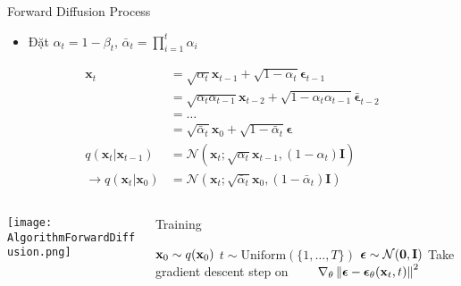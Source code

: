 \begin{frame}{Forward Diffusion Process}
\small
\begin{itemize}[]
	\item Đặt $\alpha_t = 1 - \beta_t$, $\bar{\alpha}_t = \prod_{i=1}^t \alpha_i$
\end{itemize}
\vspace{-15pt}
\begin{align*}
	\mathbf{x}_t & = \sqrt{\alpha_t}\mathbf{x}_{t-1} + \sqrt{1 - \alpha_t} \boldsymbol{\epsilon}_{t-1} \\
						& = \sqrt{\alpha_t \alpha_{t-1}} \mathbf{x}_{t-2} + \sqrt{1 - \alpha_t \alpha_{t-1}} \bar{\boldsymbol{\epsilon}}_{t-2} \\
						& = \dots \\
						& = \sqrt{\bar{\alpha}_t}\mathbf{x}_0 + \sqrt{1 - \bar{\alpha}_t}\boldsymbol{\epsilon} \\
						q(\mathbf{x}_t \vert \mathbf{x}_{t-1}) &= \mathcal{N}(\mathbf{x}_t; \sqrt{\alpha_t} \mathbf{x}_{t-1}, (1 - \alpha_t)\mathbf{I}) \\ 
						\rightarrow q(\mathbf{x}_t \vert \mathbf{x}_0) &= \mathcal{N}(\mathbf{x}_t; \sqrt{\bar{\alpha}_t} \mathbf{x}_0, (1 - \bar{\alpha}_t)\mathbf{I})
\end{align*}
\vspace{-20pt}
	
\begin{columns}
\begin{column}{0.5\textwidth}
	\texttt{[image: AlgorithmForwardDiffusion.png]}
\end{column}


	
\begin{column}{0.5\textwidth}
	\footnotesize
	\begin{algorithm}[H]
		\caption{Training} \label{alg:training}
		\begin{algorithmic}[1]
			\footnotesize
			\Repeat
			\State $\mathbf{x}_0 \sim q(\mathbf{x}_0)$
			\State $t \sim \mathrm{Uniform}(\{1, \dotsc, T\})$
			\State ${\boldsymbol{\epsilon}}\sim\mathcal{N}(\mathbf{0},\mathbf{I})$
			\State Take gradient descent step on
			\Statex $\qquad \nabla_\theta \left\| {\boldsymbol{\epsilon}} - {\boldsymbol{\epsilon}}_\theta(\mathbf{x}_t, t) \right\|^2$
		\end{algorithmic}
	\end{algorithm}


\end{column}
\end{columns}
\end{frame}
